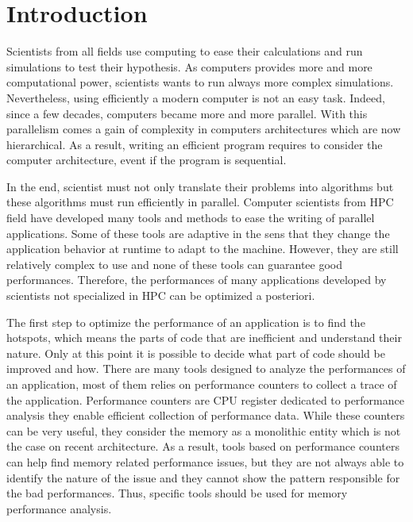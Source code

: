 \chapter{Introduction}

Scientists from all fields use computing to ease their calculations and run simulations to test their hypothesis.
As computers provides more and more computational power, scientists wants to run always more complex simulations.
Nevertheless, using efficiently a modern computer is not an easy task.
Indeed, since a few decades, computers became more and more parallel.
With this parallelism comes a gain of complexity in computers architectures which are now hierarchical.
As a result, writing an efficient program requires to consider the computer architecture, event if the program is sequential.

In the end, scientist must not only translate their problems into algorithms but these algorithms must run efficiently in parallel.
Computer scientists from \gls{HPC} field have developed many tools and methods to ease the writing of parallel applications.
Some of these tools are adaptive in the sens that they change the application behavior at runtime to adapt to the machine.
However, they are still relatively complex to use and none of these tools can guarantee good performances.
Therefore, the performances of many applications developed by scientists not specialized in \gls{HPC} can be optimized a posteriori.

The first step to optimize the performance of an application is to find the hotspots, which means the parts of code that are inefficient and understand their nature.
Only at this point it is possible to decide what part of code should be improved and how.
There are many tools designed to analyze the performances of an application, most of them relies on performance counters to collect a trace of the application.
Performance counters are \gls{CPU} register dedicated to performance analysis they enable efficient collection of performance data.
While these counters can be very useful, they consider the memory as a monolithic entity which is not the case on recent architecture.
As a result, tools based on performance counters can help find memory related performance issues, but they are not always able to identify the nature of the issue and they cannot show the pattern responsible for the bad performances.
Thus, specific tools should be used for memory performance analysis.

